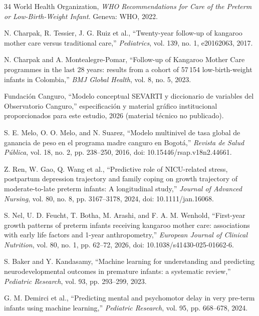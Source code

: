 \begin{thebibliography}{34}
World Health Organization, \emph{WHO Recommendations for Care of the Preterm or Low-Birth-Weight Infant}. Geneva: WHO, 2022.

N. Charpak, R. Tessier, J. G. Ruiz et al., ``Twenty-year follow-up of kangaroo mother care versus traditional care,'' \emph{Pediatrics}, vol. 139, no. 1, e20162063, 2017.

N. Charpak and A. Montealegre-Pomar, ``Follow-up of Kangaroo Mother Care programmes in the last 28 years: results from a cohort of 57\,154 low-birth-weight infants in Colombia,'' \emph{BMJ Global Health}, vol. 8, no. 5, 2023.

Fundación Canguro, ``Modelo conceptual SEVARTI y diccionario de variables del Observatorio Canguro,'' especificación y material gráfico institucional proporcionados para este estudio, 2026 (material técnico no publicado).

S. E. Melo, O. O. Melo, and N. Suarez, ``Modelo multinivel de tasa global de ganancia de peso en el programa madre canguro en Bogotá,'' \emph{Revista de Salud Pública}, vol. 18, no. 2, pp. 238--250, 2016, doi: 10.15446/rsap.v18n2.44661.

Z. Ren, W. Gao, Q. Wang et al., ``Predictive role of NICU-related stress, postpartum depression trajectory and family coping on growth trajectory of moderate-to-late preterm infants: A longitudinal study,'' \emph{Journal of Advanced Nursing}, vol. 80, no. 8, pp. 3167--3178, 2024, doi: 10.1111/jan.16068.

S. Nel, U. D. Feucht, T. Botha, M. Arashi, and F. A. M. Wenhold, ``First-year growth patterns of preterm infants receiving kangaroo mother care: associations with early life factors and 1-year anthropometry,'' \emph{European Journal of Clinical Nutrition}, vol. 80, no. 1, pp. 62--72, 2026, doi: 10.1038/s41430-025-01662-6.

S. Baker and Y. Kandasamy, ``Machine learning for understanding and predicting neurodevelopmental outcomes in premature infants: a systematic review,'' \emph{Pediatric Research}, vol. 93, pp. 293--299, 2023.

G. M. Demirci et al., ``Predicting mental and psychomotor delay in very pre-term infants using machine learning,'' \emph{Pediatric Research}, vol. 95, pp. 668--678, 2024.


\end{thebibliography}
